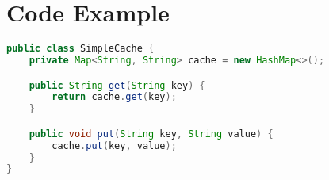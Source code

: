 \documentclass[a4paper, 11pt]{book}
\begin{document}
    \section{Code Example}
    \begin{lstlisting}[language=Java, caption=Java Code for a Simple Cache]
public class SimpleCache {
    private Map<String, String> cache = new HashMap<>();

    public String get(String key) {
        return cache.get(key);
    }

    public void put(String key, String value) {
        cache.put(key, value);
    }
}
    \end{lstlisting}
\end{document}
